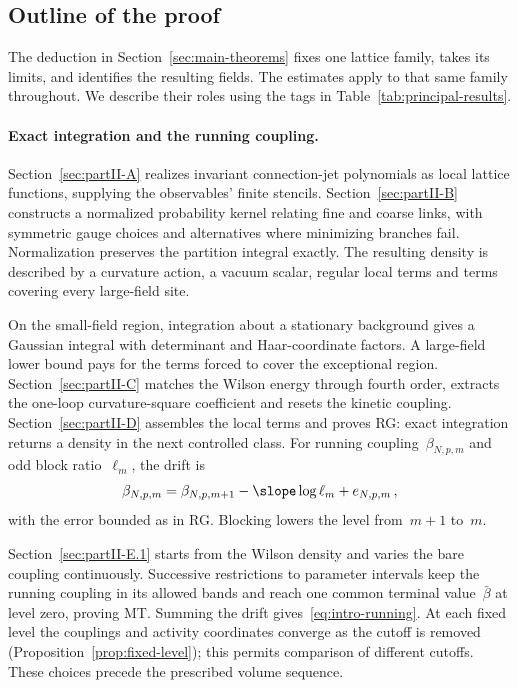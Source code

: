 \subsection{Outline of the proof}\label{sec:intro-outline}

The deduction in Section~\ref{sec:main-theorems} fixes one lattice family, takes its limits, and identifies the resulting fields. The estimates apply to that same family throughout. We describe their roles using the tags in Table~\ref{tab:principal-results}.

\paragraph{Exact integration and the running coupling.}
Section~\ref{sec:partII-A} realizes invariant connection-jet polynomials as local lattice functions, supplying the observables' finite stencils. Section~\ref{sec:partII-B} constructs a normalized probability kernel relating fine and coarse links, with symmetric gauge choices and alternatives where minimizing branches fail. Normalization preserves the partition integral exactly. The resulting density is described by a curvature action, a vacuum scalar, regular local terms and terms covering every large-field site.

On the small-field region, integration about a stationary background gives a Gaussian integral with determinant and Haar-coordinate factors. A large-field lower bound pays for the terms forced to cover the exceptional region. Section~\ref{sec:partII-C} matches the Wilson energy through fourth order, extracts the one-loop curvature-square coefficient and resets the kinetic coupling. Section~\ref{sec:partII-D} assembles the local terms and proves RG: exact integration returns a density in the next controlled class. For running coupling~$\beta_{N,p,m}$ and odd block ratio~$\ell_m$, the drift is
\begin{equation*}
\beta_{N,p,m}=\beta_{N,p,m+1}-\slope\log\ell_m+e_{N,p,m}\,,
\end{equation*}
with the error bounded as in RG. Blocking lowers the level from~$m+1$ to~$m$.

Section~\ref{sec:partII-E.1} starts from the Wilson density and varies the bare coupling continuously. Successive restrictions to parameter intervals keep the running coupling in its allowed bands and reach one common terminal value~$\bar\beta$ at level zero, proving MT. Summing the drift gives~\eqref{eq:intro-running}. At each fixed level the couplings and activity coordinates converge as the cutoff is removed (Proposition~\ref{prop:fixed-level}); this permits comparison of different cutoffs. These choices precede the prescribed volume sequence.

